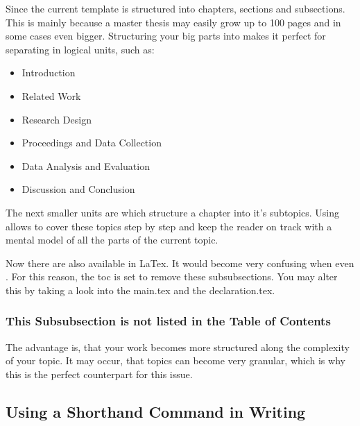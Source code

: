 Since the current template is structured into chapters, sections and subsections. This is mainly because a master thesis may easily grow up to 100 pages and in some cases even bigger. Structuring your big parts into  makes it perfect for separating in logical units, such as:

\begin{itemize}
	\item Introduction
	\item Related Work
	\item Research Design
	\item Proceedings and Data Collection
	\item Data Analysis and Evaluation
	\item Discussion and Conclusion
\end{itemize}
\ThinHRule

The next smaller units are  which structure a chapter into it's subtopics. Using  allows to cover these topics step by step and keep the reader on track with a mental model of all the parts of the current topic.\\
\ThinHRule

Now there are also  available in LaTex. It would become very confusing when even . For this reason, the toc is set to remove these subsubsections. You may alter this by taking a look into the main.tex and the declaration.tex. 
\ThinHRule

\subsubsection{\textcolor{SECTION_COL}{This Subsubsection is not listed in the Table of Contents}}

The advantage is, that your work becomes more structured along the complexity of your topic. It may occur, that topics can become very granular, which is why this is the perfect counterpart for this issue.



\subsection{Using a Shorthand Command in Writing}

